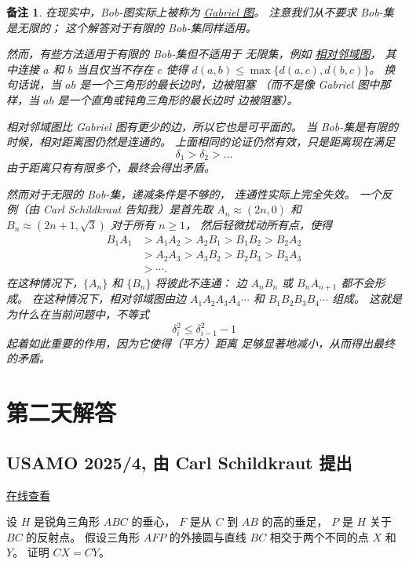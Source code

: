 \documentclass[11pt]{article}
\theoremstyle{claimstyle}
\theoremstyle{remarkstyle}
\newtheorem{remark}{备注}
\begin{document}
\begin{remark}
  在现实中，Bob-图实际上被称为 \href{https://w.wiki/DVnd}{Gabriel 图}。
  注意我们从不要求 Bob-集是无限的；
  这个解答对于有限的 Bob-集同样适用。

  然而，有些方法适用于有限的 Bob-集但不适用于
  无限集，例如 \href{https://www.graphclasses.org/classes/gc_1224.html}{相对邻域图}，
  其中连接 $a$ 和 $b$ 当且仅当不存在 $c$ 使得
  $d(a,b) \le \max \{d(a,c), d(b,c)\}$。
  换句话说，当 $ab$ 是一个三角形的最长边时，边被阻塞
  （而不是像 Gabriel 图中那样，当 $ab$ 是一个直角或钝角三角形的最长边时
  边被阻塞）。

  相对邻域图比 Gabriel 图有更少的边，所以它也是可平面的。
  当 Bob-集是有限的时候，相对距离图仍然是连通的。
  上面相同的论证仍然有效，只是距离现在满足
  \[ \delta_1 > \delta_2 > \dots \]
  由于距离只有有限多个，最终会得出矛盾。

  然而对于无限的 Bob-集，递减条件是不够的，
  连通性实际上完全失效。
  一个反例（由 Carl Schildkraut 告知我）是首先取
  $A_n \approx (2n,0)$ 和 $B_n \approx (2n+1, \sqrt3)$ 对于所有 $n \ge 1$，
  然后轻微扰动所有点，使得
  \begin{align*}
    B_1A_1 &> A_1A_2 > A_2B_1 > B_1B_2 > B_2A_2 \\
    &> A_2A_3 > A_3B_2 > B_2B_3 > B_3A_3 \\
    &> \dotsb.
  \end{align*}
  在这种情况下，$\{A_n\}$ 和 $\{B_n\}$ 将彼此不连通：
  边 $A_nB_n$ 或 $B_nA_{n+1}$ 都不会形成。
  在这种情况下，相对邻域图由边
  $A_1A_2A_3A_4 \dotsm$ 和 $B_1 B_2 B_3 B_4 \dotsm$ 组成。
  这就是为什么在当前问题中，不等式
  \[ \delta_i^2 \le \delta_{i-1}^2 - 1 \]
  起着如此重要的作用，因为它使得（平方）距离
  足够显著地减小，从而得出最终的矛盾。
\end{remark}

\pagebreak

\section{第二天解答}

\subsection{USAMO 2025/4, 由 Carl Schildkraut 提出}
\href{https://aops.com/community/p34335844}{在线查看}

\begin{problembox}
设 $H$ 是锐角三角形 $ABC$ 的垂心，
$F$ 是从 $C$ 到 $AB$ 的高的垂足，
$P$ 是 $H$ 关于 $BC$ 的反射点。
假设三角形 $AFP$ 的外接圆与直线 $BC$ 相交于两个不同的点 $X$ 和 $Y$。
证明 $CX = CY$。
\end{problembox}
\end{document}
